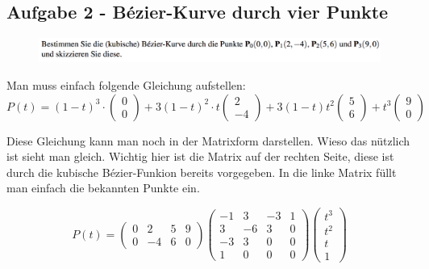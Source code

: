 \subsection{Aufgabe 2 - Bézier-Kurve durch vier Punkte}
\begin{figure}[!ht]
	\centering
	\includegraphics[width=1.0\linewidth]{fig/ueb_curves_2}
\end{figure}
Man muss einfach folgende Gleichung aufstellen:
\begin{displaymath}
P\left( t\right) = \left( 1-t\right)^3 \cdot \begin{pmatrix}0 \\ 0\end{pmatrix} + 3\left( 1-t\right)^2\cdot t \begin{pmatrix}2 \\ -4\end{pmatrix} + 3\left( 1-t\right)t^2\begin{pmatrix}5 \\ 6\end{pmatrix} + t^3\begin{pmatrix}9 \\ 0\end{pmatrix}
\end{displaymath}

Diese Gleichung kann man noch in der Matrixform darstellen. Wieso das nützlich ist sieht man gleich. Wichtig hier ist die Matrix auf der rechten Seite, diese ist durch die kubische Bézier-Funkion bereits vorgegeben. In die linke Matrix füllt man einfach die bekannten Punkte ein.

\begin{displaymath}
P(t) = 
\begin{pmatrix}
0 & 2 & 5 & 9 \\
0 & -4 & 6 & 0
\end{pmatrix}
\begin{pmatrix}
-1 & 3 & -3 & 1 \\
3 & -6 & 3 & 0 \\
-3 & 3 & 0 & 0 \\
1 & 0 & 0 & 0
\end{pmatrix}
\begin{pmatrix}
t^3\\
t^2\\
t\\
1
\end{pmatrix}
\end{displaymath}

